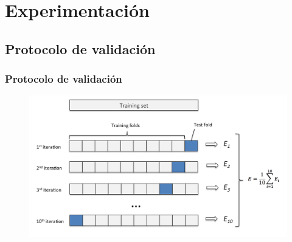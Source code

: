 \section{Experimentación}
\subsection{Protocolo de validación}
\begin{frame}
  \frametitle{Protocolo de validación}
\begin{figure}[htp]
 \begin{center}
   \includegraphics[width=.8\textwidth]{imagenes/chapter4/cross-validation}
 \end{center}
\end{figure}

\end{frame}

